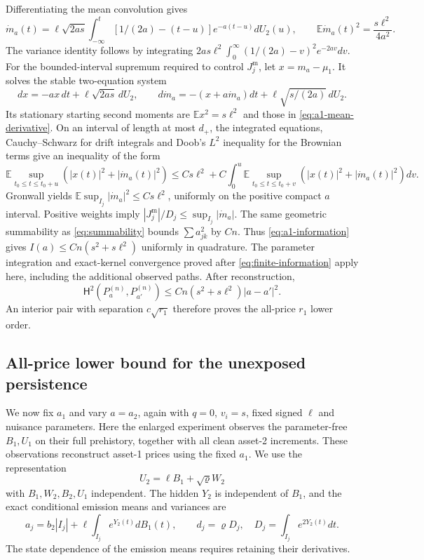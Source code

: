 \documentclass[11pt,a4paper]{amsart}
\theoremstyle{plain}
\theoremstyle{definition}
\theoremstyle{remark}
\newcommand{\EE}{\mathbb{E}}
\newcommand{\Hell}{\mathsf H}
\begin{document}
Differentiating the mean convolution gives
\begin{equation}\label{eq:a1-mean-derivative}
 \dot m_a(t)=\ell\sqrt{2as}\int_{-\infty}^t
       [1/(2a)-(t-u)]e^{-a(t-u)}dU_2(u),
 \qquad \EE\dot m_a(t)^2=\frac{s\ell^2}{4a^2}.
\end{equation}
The variance identity follows by integrating
$2as\ell^2\int_0^\infty(1/(2a)-v)^2e^{-2av}dv$.
For the bounded-interval supremum required to control $J_j^{\mathrm m}$,
let $x=m_a-\mu_1$. It solves the stable two-equation system
\[
 dx=-ax\,dt+\ell\sqrt{2as}\,dU_2,
 \qquad d\dot m_a=-(x+a\dot m_a)dt
                         +\ell\sqrt{s/(2a)}\,dU_2.
\]
Its stationary starting second moments are $\EE x^2=s\ell^2$ and those
in \eqref{eq:a1-mean-derivative}. On an interval of length at most $d_+$,
the integrated equations, Cauchy--Schwarz for drift integrals and Doob's
$L^2$ inequality for the Brownian terms give an inequality of the form
\[
 \EE\sup_{t_0\le t\le t_0+u}(|x(t)|^2+|\dot m_a(t)|^2)
 \le Cs\ell^2+C\int_0^u
       \EE\sup_{t_0\le t\le t_0+v}(|x(t)|^2+|\dot m_a(t)|^2)dv.
\]
Gronwall yields $\EE\sup_{I_j}|\dot m_a|^2\le Cs\ell^2$, uniformly on
the positive compact $a$ interval. Positive weights imply
$|J_j^{\mathrm m}|/D_j\le\sup_{I_j}|\dot m_a|$.
The same geometric summability as \eqref{eq:summability} bounds
$\sum a_{jk}^2$ by $Cn$. Thus \eqref{eq:a1-information} gives
$I(a)\le Cn(s^2+s\ell^2)$ uniformly in quadrature. The parameter
integration and exact-kernel convergence proved after
\eqref{eq:finite-information} apply here, including the additional observed paths.
After reconstruction,
\begin{equation}\label{eq:a1-Hellinger}
 \Hell^2(P_a^{(n)},P_{a'}^{(n)})
                  \le Cn(s^2+s\ell^2)|a-a'|^2.
\end{equation}
An interior pair with separation $c\sqrt{r_1}$ therefore proves the
all-price $r_1$ lower order.

\subsection{All-price lower bound for the unexposed persistence}

We now fix $a_1$ and vary $a=a_2$, again with $q=0$, $v_i=s$, fixed signed
$\ell$ and nuisance parameters. Here the enlarged experiment observes the
parameter-free $B_1,U_1$ on their full prehistory, together with all clean
asset-2 increments. These observations reconstruct asset-1 prices using the
fixed $a_1$. We use the representation
\[
 U_2=\ell B_1+\sqrt{\varrho}W_2
\]
with $B_1,W_2,B_2,U_1$ independent. The hidden $Y_2$ is independent of
$B_1$, and the exact conditional emission means and variances are
\begin{equation}\label{eq:a2-emission}
 a_j=b_2|I_j|+\ell\int_{I_j}e^{Y_2(t)}dB_1(t),\qquad
 d_j=\varrho D_j,\quad D_j=\int_{I_j}e^{2Y_2(t)}dt.
\end{equation}
The state dependence of the emission means requires retaining their derivatives.
\end{document}
